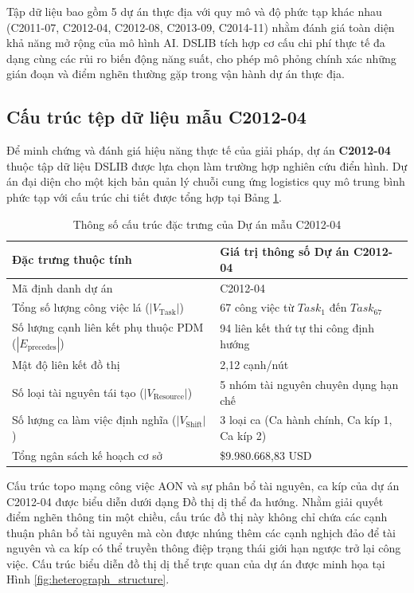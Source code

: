 Tập dữ liệu bao gồm 5 dự án thực địa với quy mô và độ phức tạp khác nhau (C2011-07, C2012-04, C2012-08, C2013-09, C2014-11) nhằm đánh giá toàn diện khả năng mở rộng của mô hình AI. DSLIB tích hợp cơ cấu chi phí thực tế đa dạng cùng các rủi ro biến động năng suất, cho phép mô phỏng chính xác những gián đoạn và điểm nghẽn thường gặp trong vận hành dự án thực địa.

\subsection{Cấu trúc tệp dữ liệu mẫu C2012-04}
Để minh chứng và đánh giá hiệu năng thực tế của giải pháp, dự án \textbf{C2012-04} thuộc tập dữ liệu DSLIB được lựa chọn làm trường hợp nghiên cứu điển hình. Dự án đại diện cho một kịch bản quản lý chuỗi cung ứng logistics quy mô trung bình phức tạp với cấu trúc chi tiết được tổng hợp tại Bảng \ref{tab:case_study_c2012_04}.

\begin{table}[H]
\centering
\caption{Thông số cấu trúc đặc trưng của Dự án mẫu C2012-04}
\label{tab:case_study_c2012_04}
\small
\begin{tabular}{ll}
\toprule
\textbf{Đặc trưng thuộc tính} & \textbf{Giá trị thông số Dự án C2012-04} \\
\midrule
Mã định danh dự án & C2012-04 \\
Tổng số lượng công việc lá ($|V_{\text{Task}}|$) & 67 công việc từ $Task_1$ đến $Task_{67}$ \\
Số lượng cạnh liên kết phụ thuộc PDM ($|E_{\text{precedes}}|$) & 94 liên kết thứ tự thi công định hướng \\
Mật độ liên kết đồ thị & 2,12 cạnh/nút \\
Số loại tài nguyên tái tạo ($|V_{\text{Resource}}|$) & 5 nhóm tài nguyên chuyên dụng hạn chế \\
Số lượng ca làm việc định nghĩa ($|V_{\text{Shift}}|$) & 3 loại ca (Ca hành chính, Ca kíp 1, Ca kíp 2) \\
Tổng ngân sách kế hoạch cơ sở & \$9.980.668,83 USD \\
\bottomrule
\end{tabular}
\end{table}

Cấu trúc topo mạng công việc AON và sự phân bổ tài nguyên, ca kíp của dự án C2012-04 được biểu diễn dưới dạng Đồ thị dị thể đa hướng. Nhằm giải quyết điểm nghẽn thông tin một chiều, cấu trúc đồ thị này không chỉ chứa các cạnh thuận phân bổ tài nguyên mà còn được nhúng thêm các cạnh nghịch đảo để tài nguyên và ca kíp có thể truyền thông điệp trạng thái giới hạn ngược trở lại công việc. Cấu trúc biểu diễn đồ thị dị thể trực quan của dự án được minh họa tại Hình \ref{fig:heterograph_structure}.


